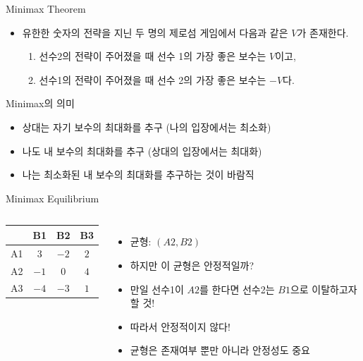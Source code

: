 \documentclass[final]{beamer}
\begin{document}
\begin{frame}[t]{Minimax Theorem}
	\begin{itemize}
		\item 유한한 숫자의 전략을 지닌 두 명의 제로섬 게임에서 다음과 같은 $V$가 존재한다. 
		\begin{enumerate}
			\item 선수2의 전략이 주어졌을 때 선수 1의 가장 좋은 보수는 $V$이고, 
			\item 선수1의 전략이 주어졌을 때 선수 2의 가장 좋은 보수는 $-V$다. 
		\end{enumerate} 
	\end{itemize}
\end{frame}

\begin{frame}[t]{Minimax의 의미}
	\begin{itemize}
		\item 상대는 자기 보수의 최대화를 추구 (나의 입장에서는 최소화)
		\item 나도 내 보수의 최대화를 추구 (상대의 입장에서는 최대화)
		\item 나는 최소화된 내 보수의 최대화를 추구하는 것이 바람직
	\end{itemize}
\end{frame}

\begin{frame}[t]{Minimax Equilibrium}
	\begin{columns}
		\begin{center}
			\begin{table}
			\begin{tabular}{|c|c|c|c|} \hline
			& {B1} &  {B2} & {B3}\\ \hline
			{A1} & {$3$} & {$-2$} & {$2$} \\ \hline%
			{A2} & {$-1$} & {$0$} & {$4$} \\ \hline
			{A3} & {$-4$}  & {$-3$} & {$1$} \\ \hline
			\end{tabular}
			\end{table}
		\end{center}
		\begin{itemize}
			\item 균형: $(A2,B2)$
			\item 하지만 이 균형은 안정적일까? 
			\item 만일 선수1이 $A2$를 한다면 선수2는 $B1$으로 이탈하고자 할 것! 
			\item 따라서 안정적이지 않다!
			\item 균형은 존재여부 뿐만 아니라 안정성도 중요
		\end{itemize}
	\end{columns}
\end{frame}
\end{document}
